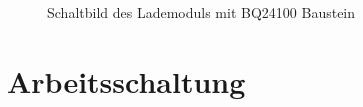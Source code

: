 \documentclass[12pt]{scrreprt} %
\begin{document}
\begin{figure}
\centering
{}
\caption[Schaltbild des Lademoduls, BQ24100]{Schaltbild des Lademoduls mit BQ24100 Baustein}
\label{pic.BQ24100}
\end{figure}
\section{Arbeitsschaltung}
\end{document}
